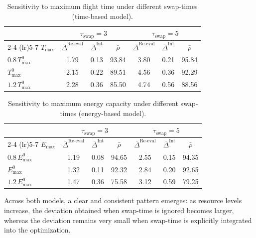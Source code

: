 \documentclass[3p, authoryear, 11pt]{elsarticle}
\begin{document}
\begin{table}[H]
\centering
\caption{Sensitivity to maximum flight time under different swap-times (time-based model).}
\label{tab:sensitivity_flight_time}
\scriptsize
\begin{tabular}{lcccccc}
\toprule
& \multicolumn{3}{c}{$\tau_{\mathrm{swap}}=3$} &
  \multicolumn{3}{c}{$\tau_{\mathrm{swap}}=5$} \\
\cmidrule(lr){2-4} \cmidrule(lr){5-7}
$T_{\max}$ &
$\bar{\Delta}^{\mathrm{Re\text{-}eval}}$ &
$\bar{\Delta}^{\mathrm{Int}}$ &
$\bar{\rho}$ &
$\bar{\Delta}^{\mathrm{Re\text{-}eval}}$ &
$\bar{\Delta}^{\mathrm{Int}}$ &
$\bar{\rho}$ \\
\midrule
$0.8\,T_{\max}^{0}$ & 1.79 & 0.13 & 93.84 & 3.80 & 0.21 & 95.84 \\
$T_{\max}^{0}$     & 2.15 & 0.22 & 89.51 & 4.56  & 0.36 & 92.29 \\
$1.2\,T_{\max}^{0}$ & 2.28 & 0.36 & 85.50 & 4.74  & 0.56 & 88.56 \\
\bottomrule
\end{tabular}
\end{table}

\begin{table}[H]
\centering
\caption{Sensitivity to maximum energy capacity under different swap-times (energy-based model).}
\label{tab:sensitivity_energy}
\scriptsize
\begin{tabular}{lcccccc}
\toprule
& \multicolumn{3}{c}{$\tau_{\mathrm{swap}}=3$} &
  \multicolumn{3}{c}{$\tau_{\mathrm{swap}}=5$} \\
\cmidrule(lr){2-4} \cmidrule(lr){5-7}
$E_{\max}$ &
$\bar{\Delta}^{\mathrm{Re\text{-}eval}}$ &
$\bar{\Delta}^{\mathrm{Int}}$ &
$\bar{\rho}$ &
$\bar{\Delta}^{\mathrm{Re\text{-}eval}}$ &
$\bar{\Delta}^{\mathrm{Int}}$ &
$\bar{\rho}$ \\
\midrule
$0.8\,E_{\max}^{0}$ & 1.19 & 0.08 & 94.65 & 2.55 & 0.15 & 94.35 \\
$E_{\max}^{0}$     & 1.32 & 0.11 & 92.32 & 2.84 & 0.20 & 92.65 \\
$1.2\,E_{\max}^{0}$ & 1.47 & 0.36 & 75.58 & 3.12 & 0.59 & 79.25 \\
\bottomrule
\end{tabular}
\end{table}

Across both models, a clear and consistent pattern emerges: as resource levels increase, the deviation obtained when swap-time is ignored becomes larger, whereas the deviation remains very small when swap-time is explicitly integrated into the optimization.
\end{document}
